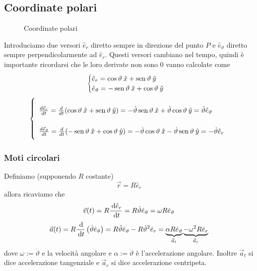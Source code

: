 \documentclass{article}
\theoremstyle{plain}
\begin{document}
\subsection{Coordinate polari}
\begin{figure}[h]
    \centering
    \caption{Coordinate polari}
\end{figure}
Introduciamo due versori $\hat{e}_r$ diretto sempre in direzione del punto $P$ e $\hat{e}_\vartheta$ diretto sempre perpendicolarmente ad $\hat{e}_r$. Questi versori cambiano nel tempo, quindi è importante ricordarsi che le loro derivate non sono 0 vanno calcolate come 
\[\begin{cases}
    \hat e_r= \cos\vartheta \:\hat x+\operatorname{sen}\vartheta \:\hat y\\
    \hat e_\vartheta= -\operatorname{sen}\vartheta \:\hat x+\cos\vartheta \:\hat y
\end{cases}\]
\[\renewcommand{\arraystretch}{2.5}
    \left\{\begin{array}{l}
    \frac{d\vec{e}_r}{dt}=\frac{d}{dt}(\cos\vartheta \:\hat x+\sen\vartheta \:\hat y)=-\dot \vartheta \sin \vartheta\:\hat x+\dot \vartheta \cos\vartheta \:\hat y=\dot \vartheta \hat e_\vartheta\\
    \frac{d\vec{e}_\vartheta}{dt}=\frac{d}{dt}(-\sin\vartheta \:\hat x+\cos\vartheta \:\hat y)=-\dot \vartheta \cos \vartheta\:\hat x-\dot \vartheta \sin\vartheta \:\hat y=-\dot \vartheta \hat e_r
\end{array}\right.
\]
\subsubsection{Moti circolari}
Definiamo (supponendo $R$ costante)
\[\vec r = R\hat e_r\]
allora ricaviamo che
\[\vec{v}(t)=R\frac{\:\text{d} \hat e_r}{\:\text{d} t}=R\dot\vartheta \hat e_\vartheta=\omega R \hat e_\vartheta\]
\[\vec a(t)=R\frac{\:\text{d}}{\:\text{d} t}\left(\dot\vartheta \hat e_\vartheta \right)= R \ddot \vartheta \hat e_\vartheta -R\dot\vartheta ^2\hat e_r=\underbrace{\alpha R \hat e_\vartheta}_{\vec{a}_t} \underbrace{-\omega^2 R\hat e_r}_{\vec{a}_c}\]
dove $\omega :=\dot \vartheta$ e la velocità angolare e $\alpha := \ddot \vartheta$ è l'accelerazione angolare. Inoltre $\vec{a}_t$ si dice accelerazione tangenziale e $\vec{a}_c$ si dice accelerazione centripeta.
\end{document}
